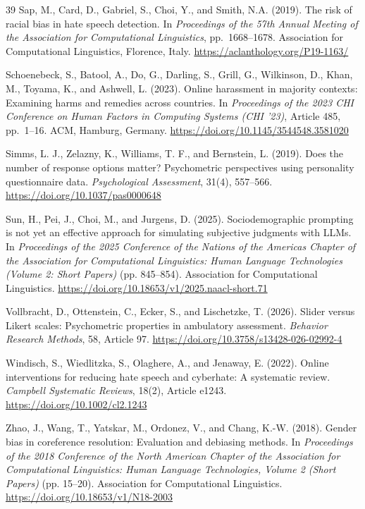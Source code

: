 \documentclass[a4paper,fleqn,review,longmktitle]{cas-sc}
\begin{document}
\begin{thebibliography}{39}
Sap, M., Card, D., Gabriel, S., Choi, Y., and Smith, N.A. (2019).
The risk of racial bias in hate speech detection.
In \emph{Proceedings of the 57th Annual Meeting of the Association for Computational Linguistics}, pp.~1668--1678. Association for Computational Linguistics, Florence, Italy.
\url{https://aclanthology.org/P19-1163/}

Schoenebeck, S., Batool, A., Do, G., Darling, S., Grill, G., Wilkinson, D., Khan, M., Toyama, K., and Ashwell, L. (2023).
Online harassment in majority contexts: Examining harms and remedies across countries.
In \emph{Proceedings of the 2023 CHI Conference on Human Factors in Computing Systems (CHI '23)}, Article 485, pp.~1--16. ACM, Hamburg, Germany.
\url{https://doi.org/10.1145/3544548.3581020}

Simms, L. J., Zelazny, K., Williams, T. F., and Bernstein, L. (2019).
Does the number of response options matter? Psychometric perspectives using personality questionnaire data.
\emph{Psychological Assessment}, 31(4), 557--566.
\url{https://doi.org/10.1037/pas0000648}

Sun, H., Pei, J., Choi, M., and Jurgens, D. (2025).
Sociodemographic prompting is not yet an effective approach for simulating subjective judgments with LLMs.
In \emph{Proceedings of the 2025 Conference of the Nations of the Americas Chapter of the Association for Computational Linguistics: Human Language Technologies (Volume 2: Short Papers)} (pp. 845--854).
Association for Computational Linguistics.
\url{https://doi.org/10.18653/v1/2025.naacl-short.71}

Vollbracht, D., Ottenstein, C., Ecker, S., and Lischetzke, T. (2026).
Slider versus Likert scales: Psychometric properties in ambulatory assessment.
\emph{Behavior Research Methods}, 58, Article 97.
\url{https://doi.org/10.3758/s13428-026-02992-4}

Windisch, S., Wiedlitzka, S., Olaghere, A., and Jenaway, E. (2022).
Online interventions for reducing hate speech and cyberhate: A systematic review.
\emph{Campbell Systematic Reviews}, 18(2), Article e1243.
\url{https://doi.org/10.1002/cl2.1243}

Zhao, J., Wang, T., Yatskar, M., Ordonez, V., and Chang, K.-W. (2018).
Gender bias in coreference resolution: Evaluation and debiasing methods.
In \emph{Proceedings of the 2018 Conference of the North American Chapter of the Association for Computational Linguistics: Human Language Technologies, Volume 2 (Short Papers)} (pp. 15--20).
Association for Computational Linguistics.
\url{https://doi.org/10.18653/v1/N18-2003}


\end{thebibliography}
\end{document}
